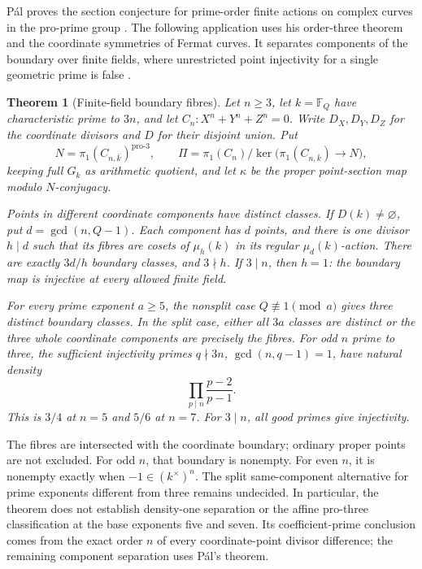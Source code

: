 \documentclass[11pt]{article}
\newcommand{\F}{\mathbb F}
\numberwithin{equation}{section}
\newtheorem{theorem}{Theorem}[section]
\theoremstyle{definition}
\begin{document}
P\'al proves the section conjecture for prime-order finite actions on
complex curves in the pro-prime group
\citep[Theorem~5.2, author pp.~12--13]{FCPal2014}.
The following application uses his order-three theorem and the
coordinate symmetries of Fermat curves. It separates components of
the boundary over finite fields, where unrestricted point injectivity
for a single geometric prime is false
\citep[Remark~10(i), pp.~742--743]{FCHoshi2009}.

\begin{theorem}[Finite-field boundary fibres]
\label{thm:finitefield-boundary-intro}
Let \(n\ge3\), let \(k=\F_Q\) have characteristic prime to \(3n\),
and let \(C_n:X^n+Y^n+Z^n=0\). Write \(D_X,D_Y,D_Z\) for the
coordinate divisors and \(D\) for their disjoint union. Put
\[
 N=\pi_1(C_{n,\bar k})^{\mathrm{pro}\text{-}3},\qquad
 \Pi=\pi_1(C_n)/\ker\bigl(\pi_1(C_{n,\bar k})\longrightarrow N\bigr),
\]
keeping full \(G_k\) as arithmetic quotient, and let \(\kappa\)
be the proper point-section map modulo \(N\)-conjugacy.

Points in different coordinate components have distinct classes.
If \(D(k)\ne\varnothing\), put \(d=\gcd(n,Q-1)\).
Each component has \(d\) points, and there is one divisor \(h\mid d\)
such that its fibres are cosets of \(\mu_h(k)\) in its regular
\(\mu_d(k)\)-action. There are exactly \(3d/h\) boundary classes,
and \(3\nmid h\). If \(3\mid n\), then \(h=1\): the boundary map
is injective at every allowed finite field.

For every prime exponent \(a\ge5\), the nonsplit case
\(Q\not\equiv1\pmod a\) gives three distinct boundary classes.
In the split case, either all \(3a\) classes are distinct or the
three whole coordinate components are precisely the fibres.
For odd \(n\) prime to three, the sufficient injectivity primes
\(q\nmid3n\), \(\gcd(n,q-1)=1\), have natural density
\[
 \prod_{p\mid n}\frac{p-2}{p-1}.
\]
This is \(3/4\) at \(n=5\) and \(5/6\) at \(n=7\).
For \(3\mid n\), all good primes give injectivity.
\end{theorem}

The fibres are intersected with the coordinate boundary; ordinary
proper points are not excluded. For odd \(n\), that boundary is
nonempty. For even \(n\), it is nonempty exactly when
\(-1\in(k^\times)^n\). The split same-component alternative for
prime exponents different from three remains undecided.
In particular, the theorem does not establish density-one separation
or the affine pro-three classification at the base exponents five
and seven. Its coefficient-prime conclusion comes from the exact
order \(n\) of every coordinate-point divisor difference; the
remaining component separation uses Pál's theorem.
\end{document}
